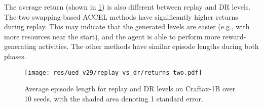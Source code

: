 \documentclass{article}
\theoremstyle{plain}
\theoremstyle{definition}
\theoremstyle{remark}
\begin{document}
The average return (shown in \cref{fig:ued:rew:both}) is also different between replay and DR levels. The two swapping-based ACCEL methods have significantly higher returns during replay. This may indicate that the generated levels are easier (e.g., with more resources near the start), and the agent is able to perform more reward-generating activities.
The other methods have similar episode lengths during both phases.
\begin{figure}[H]
    \centering
    \texttt{[image: res/ued\_v29/replay\_vs\_dr/returns\_two.pdf]}
    \caption{Average episode length for replay and DR levels on Craftax-1B over 10 seeds, with the shaded area denoting 1 standard error.}
    \label{fig:ued:rew:both}
\end{figure}





\end{document}
